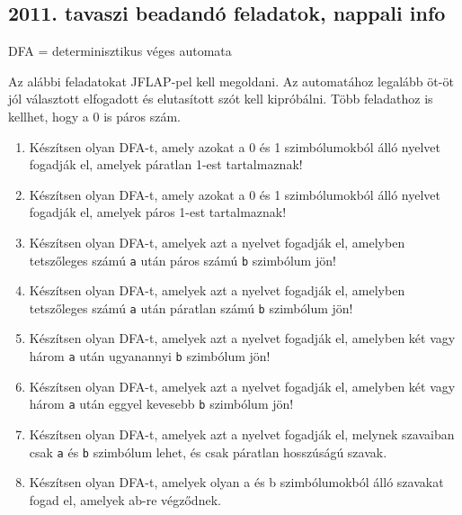 \documentclass[a4paper]{article}
\begin{document}
\newpage %

\subsection{2011. tavaszi beadandó feladatok, nappali info}

DFA = determinisztikus véges automata

Az alábbi feladatokat JFLAP-pel kell megoldani. Az automatához legalább
öt-öt jól választott elfogadott és elutasított szót kell kipróbálni.
Több feladathoz is kellhet, hogy a 0 is páros szám.

\begin{enumerate}
\item Készítsen olyan DFA-t, amely azokat a 0 és 1 szimbólumokból
álló nyelvet fogadják el, amelyek páratlan 1-est tartalmaznak!

\item Készítsen olyan DFA-t, amely azokat a 0 és 1 szimbólumokból
álló nyelvet fogadják el, amelyek páros 1-est tartalmaznak!

\item Készítsen olyan DFA-t, amelyek azt a nyelvet fogadják el, amelyben
tetszőleges számú \verb|a| után páros számú \verb|b| szimbólum jön!

\item Készítsen olyan DFA-t, amelyek azt a nyelvet fogadják el, amelyben
tetszőleges számú \verb|a| után páratlan számú \verb|b| szimbólum jön!

\item Készítsen olyan DFA-t, amelyek azt a nyelvet fogadják el, amelyben
két vagy három \verb|a| után ugyanannyi \verb|b| szimbólum jön!

\item Készítsen olyan DFA-t, amelyek azt a nyelvet fogadják el, amelyben
két vagy három \verb|a| után eggyel kevesebb \verb|b| szimbólum jön!

\item Készítsen olyan DFA-t, amelyek azt a nyelvet fogadják el, melynek
szavaiban csak \verb|a| és \verb|b| szimbólum lehet, és csak páratlan
hosszúságú szavak.

\item Készítsen olyan DFA-t, amelyek olyan a és b szimbólumokból álló szavakat
fogad el, amelyek ab-re végződnek.


\end{enumerate}
\end{document}
